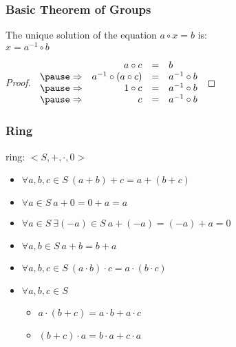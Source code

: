 \documentclass[dvipsnames]{beamer}
\begin{document}
\begin{frame}
  \frametitle{Basic Theorem of Groups}

  \begin{theorem}
    The unique solution of the equation $a \circ x = b$ is:\\
    $x = a^{-1} \circ b$
  \end{theorem}

  \pause
  \begin{proof}
    $\begin{array}{crcl}
                & a \circ c                & = & b\\\pause
    \Rightarrow & a^{-1} \circ (a \circ c) & = & a^{-1} \circ b\\\pause
    \Rightarrow & 1 \circ c                & = & a^{-1} \circ b\\\pause
    \Rightarrow & c                        & = & a^{-1} \circ b
    \end{array}$
  \end{proof}
\end{frame}

\begin{frame}
  \frametitle{Ring}

  \begin{definition}
    \alert{ring}: $<S,+,\cdot,0>$

    \begin{itemize}
      \item $\forall a,b,c \in S~(a + b) + c = a + (b + c)$
      \item $\forall a \in S~a + 0 = 0 + a = a$
      \item $\forall a \in S~\exists (-a) \in S~a + (-a) = (-a) + a = 0$
      \item $\forall a,b \in S~a + b = b + a$

      \pause
      \item $\forall a,b,c \in S~(a \cdot b) \cdot c = a \cdot (b \cdot c)$

      \pause
      \item $\forall a,b,c \in S$
      \begin{itemize}
        \item $a \cdot (b + c) = a \cdot b + a \cdot c$
        \item $(b + c) \cdot a = b \cdot a + c \cdot a$
      \end{itemize}
    \end{itemize}
  \end{definition}
\end{frame}
\end{document}
